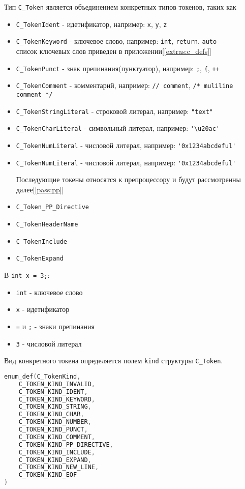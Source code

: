 Тип \verb|C_Token| является объединением конкретных типов токенов, таких как
\begin{itemize}
  \item \verb|C_TokenIdent| - идетификатор, например:
  \verb|x|, \verb|y|, \verb|z|

  \item \verb|C_TokenKeyword| - ключевое слово, например:
  \verb|int|, \verb|return|, \verb|auto| \\
  список ключевых слов приведен в приложении[\ref{extras:c_defs}]

  \item \verb|C_TokenPunct| - знак препинания(пунктуатор), например:
  \verb|;|, \verb|{|, \verb|++|

  \item \verb|C_TokenComment| - комментарий, например:
  \verb|// comment|, \verb|/* muliline comment */|

  \item \verb|C_TokenStringLiteral| - строковой литерал, например: \verb|"text"|
  \item \verb|C_TokenCharLiteral| - символьный литерал, например: \verb|'\u20ac'|
  \item \verb|C_TokenNumLiteral| - числовой литерал, например: \verb|'0x1234abcdeful'|
  \item \verb|C_TokenNumLiteral| - числовой литерал, например: \verb|'0x1234abcdeful'|

  Последующие токены относятся к препроцессору и будут рассмотренны далее[\ref{pass:pp}]
  \item \verb|C_Token_PP_Directive|
  \item \verb|C_TokenHeaderName|
  \item \verb|C_TokenInclude|
  \item \verb|C_TokenExpand|
\end{itemize}

В \verb|int x = 3;|: 
\begin{itemize}
    \item \verb|int| - ключевое слово 
    \item \verb|x| - идетификатор 
    \item \verb|=| и \verb|;| - знаки препинания 
    \item \verb|3| - числовой литерал
\end{itemize}

Вид конкретного токена определяется полем \verb|kind| структуры \verb|C_Token|.
\begin{lstlisting}[language=c, caption={Виды токенов Си}, label={lexing:kind-enum}]
enum_def(C_TokenKind, 
    C_TOKEN_KIND_INVALID,
    C_TOKEN_KIND_IDENT,
    C_TOKEN_KIND_KEYWORD,
    C_TOKEN_KIND_STRING,
    C_TOKEN_KIND_CHAR,
    C_TOKEN_KIND_NUMBER,
    C_TOKEN_KIND_PUNCT,
    C_TOKEN_KIND_COMMENT,
    C_TOKEN_KIND_PP_DIRECTIVE,
    C_TOKEN_KIND_INCLUDE,
    C_TOKEN_KIND_EXPAND,
    C_TOKEN_KIND_NEW_LINE,
    C_TOKEN_KIND_EOF
)
\end{lstlisting}


